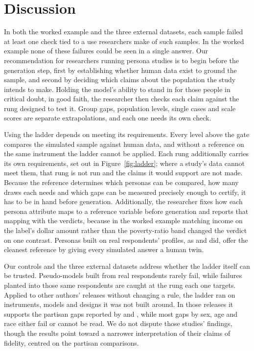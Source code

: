 
\section{Discussion}
\label{sec:discussion}

In both the worked example and the three external datasets, each sample failed at least one check tied to a use researchers make of such samples.
In the worked example none of these failures could be seen in a single answer.
Our recommendation for researchers running persona studies is to begin before the generation step, first by establishing whether human data exist to ground the sample, and second by deciding which claims about the population the study intends to make.
Holding the model's ability to stand in for those people in critical doubt, in good faith, the researcher then checks each claim against the rung designed to test it.
Group gaps, population levels, single cases and scale scores are separate extrapolations, and each one needs its own check.

Using the ladder depends on meeting its requirements.
Every level above the gate compares the simulated sample against human data, and without a reference on the same instrument the ladder cannot be applied.
Each rung additionally carries its own requirements, set out in Figure~\ref{fig:ladder}; where a study's data cannot meet them, that rung is not run and the claims it would support are not made.
Because the reference determines which personas can be compared, how many draws each needs and which gaps can be measured precisely enough to certify, it has to be in hand before generation.
Additionally, the researcher fixes how each persona attribute maps to a reference variable before generation and reports that mapping with the verdicts, because in the worked example matching income on the label's dollar amount rather than the poverty-ratio band changed the verdict on one contrast. %
Personas built on real respondents' profiles, as \citet{bisbee2024synthetic} and \citet{argyle2023outofone} did, offer the cleanest reference by giving every simulated answer a human twin.

Our controls and the three external datasets address whether the ladder itself can be trusted.
Pseudo-models built from real respondents rarely fail, while failures planted into those same respondents are caught at the rung each one targets.
Applied to other authors' releases without changing a rule, the ladder ran on instruments, models and designs it was not built around.
In those releases it supports the partisan gaps reported by \citet{bisbee2024synthetic} and \citet{argyle2023outofone}, while most gaps by sex, age and race either fail or cannot be read.
We do not dispute those studies' findings, though the results point toward a narrower interpretation of their claims of fidelity, centred on the partisan comparisons.

